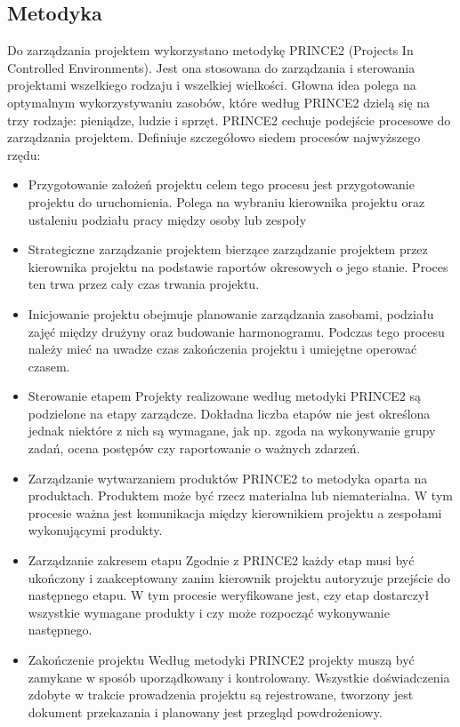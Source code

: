 \documentclass[11pt,a4paper]{article}
\begin{document}
  
  \subsection{Metodyka}
  Do zarządzania projektem wykorzystano metodykę PRINCE2 (Projects In Controlled Environments). 
  Jest ona stosowana do zarządzania i sterowania projektami wszelkiego rodzaju i wszelkiej wielkości. 
  Głowna idea polega na optymalnym wykorzystywaniu zasobów, które według PRINCE2 dzielą się na trzy rodzaje: pieniądze, ludzie i sprzęt. PRINCE2 cechuje podejście procesowe do zarządzania projektem. Definiuje szczegółowo siedem procesów najwyższego rzędu: 
  \begin{itemize}
    \item Przygotowanie założeń projektu celem tego procesu jest przygotowanie projektu do uruchomienia.
    Polega na wybraniu kierownika projektu oraz ustaleniu podziału pracy między osoby lub zespoły 
    \item Strategiczne zarządzanie projektem bierzące zarządzanie projektem przez kierownika projektu na podstawie raportów okresowych o jego stanie. Proces ten trwa przez cały czas trwania projektu. 
    \item Inicjowanie projektu obejmuje planowanie zarządzania zasobami, podziału zajęć między drużyny oraz budowanie harmonogramu.
    Podczas tego procesu należy mieć na uwadze czas zakończenia projektu i umiejętne operować czasem.  
    \item Sterowanie etapem Projekty realizowane według metodyki PRINCE2 są podzielone na etapy zarządcze. 
    Dokładna liczba etapów nie jest określona jednak niektóre z nich są wymagane, jak np. zgoda na wykonywanie grupy zadań, ocena postępów czy raportowanie o ważnych zdarzeń. 
    \item Zarządzanie wytwarzaniem produktów PRINCE2 to metodyka oparta na produktach. 
    Produktem może być rzecz materialna lub niematerialna. W tym procesie ważna jest komunikacja między kierownikiem projektu a zespołami wykonującymi produkty. 
    \item Zarządzanie zakresem etapu Zgodnie z PRINCE2 każdy etap musi być ukończony i zaakceptowany zanim kierownik projektu autoryzuje przejście do następnego etapu. W tym procesie weryfikowane jest, czy etap dostarczył wszystkie wymagane produkty i czy może rozpocząć wykonywanie następnego. 
    \item Zakończenie projektu Według metodyki PRINCE2 projekty muszą być zamykane w sposób uporządkowany i kontrolowany. 
    Wszystkie doświadczenia zdobyte w trakcie prowadzenia projektu są rejestrowane, tworzony jest dokument przekazania i planowany jest przegląd powdrożeniowy.  
 \end{itemize}
  
\end{document}
